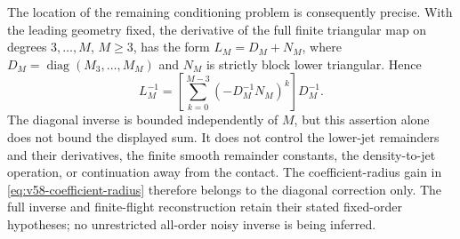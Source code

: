 The location of the remaining conditioning problem is consequently
precise.  With the leading geometry fixed, the derivative of the full
finite triangular map on degrees $3,\ldots,M$, $M\ge3$, has the form
$L_M=D_M+N_M$, where $D_M=\operatorname{diag}(M_3,\ldots,M_M)$ and
$N_M$ is strictly block lower triangular.  Hence
\begin{equation}\label{eq:v58-triangular-factorization}
 L_M^{-1}=\left[\sum_{k=0}^{M-3}(-D_M^{-1}N_M)^k\right]D_M^{-1}.
\end{equation}
The diagonal inverse is bounded independently of $M$, but this assertion
alone does not bound the displayed sum.  It does not control the
lower-jet remainders and their derivatives, the finite smooth remainder
constants, the density-to-jet operation, or continuation away from the
contact.  The coefficient-radius gain in
\eqref{eq:v58-coefficient-radius} therefore belongs to the diagonal
correction only.  The full inverse and finite-flight reconstruction
retain their stated fixed-order hypotheses; no unrestricted all-order
noisy inverse is being inferred.
